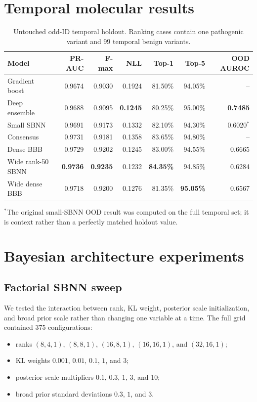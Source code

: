 \documentclass[11pt]{article}
\begin{document}
\section{Temporal molecular results}

\begin{table}[H]
\centering
\caption{Untouched odd-ID temporal holdout. Ranking cases contain one pathogenic variant and 99 temporal benign variants.}
\small
\begin{tabular}{lrrrrrr}
\toprule
Model & PR-AUC & F-max & NLL & Top-1 & Top-5 & OOD AUROC \\
\midrule
Gradient boost & 0.9674 & 0.9030 & 0.1924 & 81.50\% & 94.05\% & -- \\
Deep ensemble & 0.9688 & 0.9095 & \textbf{0.1245} & 80.25\% & 95.00\% & \textbf{0.7485} \\
Small SBNN & 0.9691 & 0.9173 & 0.1332 & 82.10\% & 94.30\% & 0.6020$^*$ \\
Consensus & 0.9731 & 0.9181 & 0.1358 & 83.65\% & 94.80\% & -- \\
Dense BBB & 0.9729 & 0.9202 & 0.1245 & 83.00\% & 94.55\% & 0.6665 \\
Wide rank-50 SBNN & \textbf{0.9736} & \textbf{0.9235} & 0.1232 & \textbf{84.35\%} & 94.85\% & 0.6284 \\
Wide dense BBB & 0.9718 & 0.9200 & 0.1276 & 81.35\% & \textbf{95.05\%} & 0.6567 \\
\bottomrule
\end{tabular}
\begin{flushleft}\footnotesize $^*$The original small-SBNN OOD result was computed on the full temporal set; it is context rather than a perfectly matched holdout value.\end{flushleft}
\end{table}

\section{Bayesian architecture experiments}

\subsection{Factorial SBNN sweep}

We tested the interaction between rank, KL weight, posterior scale initialization, and broad prior scale rather than changing one variable at a time. The full grid contained 375 configurations:
\begin{itemize}
\item ranks $(8,4,1)$, $(8,8,1)$, $(16,8,1)$, $(16,16,1)$, and $(32,16,1)$;
\item KL weights $0.001$, $0.01$, $0.1$, $1$, and $3$;
\item posterior scale multipliers $0.1$, $0.3$, $1$, $3$, and $10$;
\item broad prior standard deviations $0.3$, $1$, and $3$.
\end{itemize}
\end{document}
